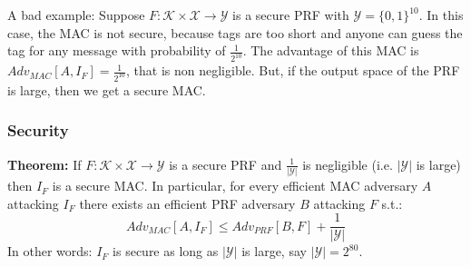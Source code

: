 \documentclass[12pt]{book}
\newcommand{\Thm}{\textbf{Theorem:} }
\begin{document}
A bad example: Suppose $F:\mathcal{K}\times\mathcal{X}\rightarrow\mathcal{Y}$ is a secure PRF with $\mathcal{Y}=\{0,1\}^{10}$. In this case, the MAC is not secure, because tags are too short and anyone can guess the tag for any message with probability of $\frac{1}{2^{10}}$. The advantage of this MAC is $Adv_{MAC}[A,I_{F}]=\frac{1}{2^{10}}$, that is non negligible. But, if the output space of the PRF is large, then we get a secure MAC.

\subsubsection{Security}
\Thm If $F:\mathcal{K}\times\mathcal{X}\rightarrow\mathcal{Y}$ is a secure PRF and $\frac{1}{|\mathcal{Y}|}$ is negligible (i.e. $|\mathcal{Y}|$ is large) then $I_{F}$ is a secure MAC. In particular, for every efficient MAC adversary $A$ attacking $I_{F}$ there exists an efficient PRF adversary $B$ attacking $F$ s.t.:
$$Adv_{MAC}[A,I_{F}]\leq Adv_{PRF}[B,F]+\frac{1}{|\mathcal{Y}|}$$In other words: $I_{F}$ is secure as long as $|\mathcal{Y}|$ is large, say $|\mathcal{Y}|=2^{80}$.
\end{document}
